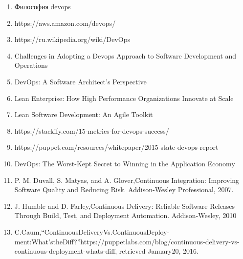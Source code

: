 

\begin{enumerate}[{label=\arabic{*}}]

    \item Философия devops
        \label{book:Effective Devops}

    \item https://aws.amazon.com/devops/
        \label{site:aws.amazon.com/devops}

    \item https://ru.wikipedia.org/wiki/DevOps
        \label{site:ru.wikipedia.org/wiki/devops}

    \item Challenges in Adopting a Devops Approach to Software Development and Operations
        \label{article:Challenges in Adopting a Devops}

    \item DevOps: A Software Architect's Perspective
        \label{book:DevOps: A Software Architect's Perspective}

    \item Lean Enterprise: How High Performance Organizations Innovate at Scale
        \label{book:Lean Enterprise}
 
    \item Lean Software Development: An Agile Toolkit
        \label{book:Lean Software Development}

    \item https://stackify.com/15-metrics-for-devops-success/
        \label{site:stackify.com/15-metrics}

    \item https://puppet.com/resources/whitepaper/2015-state-devops-report
        \label{site:puppet.com/resources/whitepaper/2015}

    \item DevOps: The Worst-Kept Secret to Winning in the Application Economy
        \label{article:DevOps:The Worst-Kept Secret}

    \item P.  M.  Duvall,  S.  Matyas,  and  A.  Glover,Continuous  Integration:   Improving Software Quality and Reducing Risk.    Addison-Wesley Professional, 2007.
        \label{book:Continuous Integration}

    \item J.  Humble  and  D.  Farley,Continuous  Delivery:   Reliable  Software  Releases Through Build, Test, and Deployment Automation.    Addison-Wesley, 2010
        \label{book:Continuous Delivery}

    \item  C.Caum,“ContinuousDeliveryVs.ContinuousDeploy-ment:What’stheDiff?”https://puppetlabs.com/blog/continuous-delivery-vs-continuous-deployment-whats-diff,   retrieved   January20, 2016.
        \label{book:Continuous Delivery vs. Continuous Deployment}
\end{enumerate}
